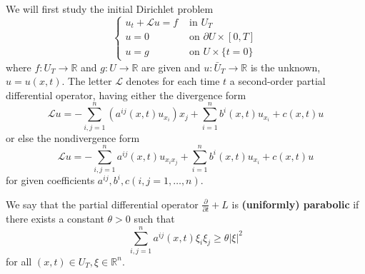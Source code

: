 \begin{definition}
    We will first study the initial Dirichlet problem
    \begin{equation*}
        \left\{\begin{aligned}
            u_t+\mathcal{L} u=f & \text { in } U_T                     \\
            u=0                 & \text { on } \partial U \times[0, T] \\
            u=g                 & \text { on } U \times\{t=0\}
        \end{aligned}\right.
    \end{equation*}
    where $f: U_T \rightarrow \mathbb{R}$ and $g: U \rightarrow \mathbb{R}$ are given and $u: \bar{U}_T \rightarrow \mathbb{R}$ is the unknown, $u=u(x, t)$.
    The letter $\mathcal{L}$ denotes for each time $t$ a second-order partial differential operator, having either the divergence form
    \begin{equation*}
        \mathcal{L} u=-\sum_{i, j=1}^n\left(a^{i j}(x, t) u_{x_i}\right) x_j+\sum_{i=1}^n b^i(x, t) u_{x_i}+c(x, t) u
    \end{equation*}
    or else the nondivergence form
    \begin{equation*}
        \mathcal{L} u=-\sum_{i, j=1}^n a^{i j}(x, t) u_{x_i x_j}+\sum_{i=1}^n b^i(x, t) u_{x_i}+c(x, t) u
    \end{equation*}
    for given coefficients $a^{i j}, b^i, c(i, j=1, \ldots, n)$.
\end{definition}

\begin{definition}
    We say that the partial differential operator $\frac{\partial}{\partial t}+L$ is \textbf{(uniformly) parabolic} if there exists a constant $\theta>0$ such that
    \begin{equation*}
        \sum_{i, j=1}^n a^{i j}(x, t) \xi_i \xi_j \geq \theta|\xi|^2
    \end{equation*}
    for all $(x, t) \in U_T, \xi \in \mathbb{R}^n$.
\end{definition}

